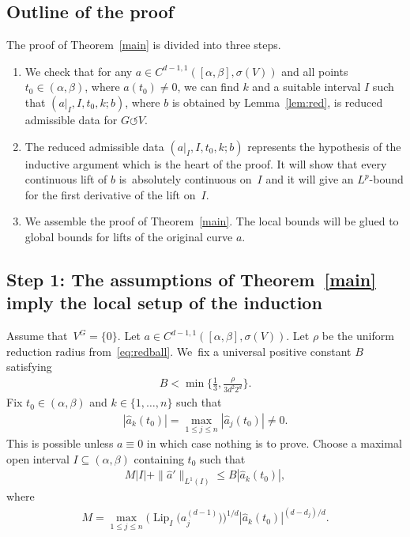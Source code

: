 \documentclass[11pt]{article}
\numberwithin{equation}{section}
\numberwithin{equation}{section}
\def\al{\alpha}
\def\be{\beta}
\def\rh{\rho}
\def\si{\sigma}
\def\Lip{\on{Lip}}
\def\const{M}
\def\we{\hat}
\def\acts{\circlearrowleft}
\let\on=\operatorname
\begin{document}
\subsection*{Outline of the proof}
The proof of Theorem~\ref{main} is divided into three steps.
\begin{enumerate}\itemsep=0pt
\setlength{\leftskip}{0.45cm}
 \item[{\it Step} 1:] We check that for any $a \in C^{d-1,1}([\al,\be],\si(V))$ and all points $t_0 \in (\al,\be)$, where \mbox{$a(t_0) \ne 0$},
 we can find $k$ and a suitable interval $I$ such that $(a|_I,I,t_0,k;b)$, where $b$ is obtained by Lemma~\ref{lem:red},
 is reduced admissible data for $G \acts V$.
 \item[{\it Step} 2:] The reduced admissible data $(a|_I,I,t_0,k;b)$ represents the hypothesis of the inductive argument which is the heart of the proof.
 It will show that every continuous lift of $b$ is~absolutely continuous on~$I$ and it will give an $L^p$-bound for the first derivative
 of the lift on~$I$.
 \item[{\it Step} 3:] We assemble the proof of Theorem~\ref{main}.
 The local bounds will be glued to global bounds for lifts of the original curve $a$.
 \end{enumerate}










\subsection*{Step 1: The assumptions of Theorem~\ref{main} imply the local setup of the induction}

Assume that~$V^G = \{0\}$.
Let $a \in C^{d-1,1}([\al,\be],\si(V))$. Let $\rh$ be the uniform reduction radius from~\eqref{eq:redball}. We~fix a universal positive constant $B$ satisfying
\begin{gather} \label{eq:constB}
 B < \min\bigg\{\frac1 3, \frac{\rh}{3 d^2 2^{d}}\bigg\}.
\end{gather}
Fix $t_0 \in (\al,\be)$ and $k \in \{1,\dots,n\}$ such that
\begin{gather} \label{k}
 |\we a_k(t_0)| = \max_{1 \le j \le n} |\we a_j(t_0)|\ne 0.
\end{gather}
This is possible unless $a \equiv 0$ in which case nothing is to prove.
Choose a maximal open interval $I \subseteq (\al,\be)$ containing $t_0$ such that
\begin{gather}\label{assumption<=}
\const |I| + \|\we a'\|_{L^1 (I)} \le B |\we a_k(t_0)|,
\end{gather}
where
\begin{gather} \label{M}
 \const = \max_{1 \le j\le n} \big(\Lip_I\big(a_j^{(d-1)}\big)\big)^{1/d} |\we a_k (t_0)|^{(d-d_j)/ d}.
\end{gather}
\end{document}
